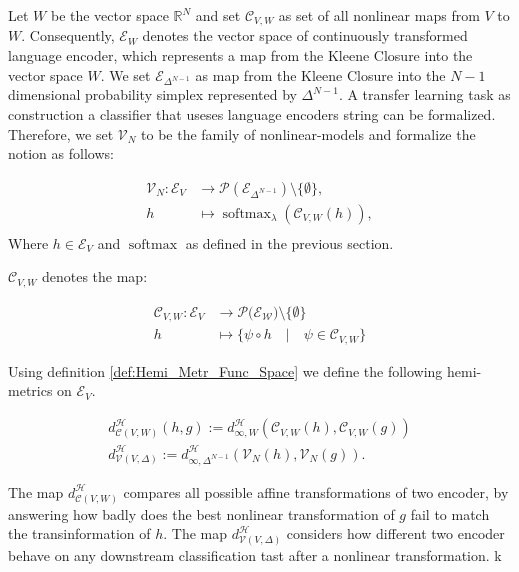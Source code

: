 Let $W$ be the vector space $\mathbb{R}^N$ and set $\mathcal{C}_{V,W}$ as set of all nonlinear maps from $V$ to $W$. 
Consequently, $\mathcal{E}_W$ denotes the vector space of continuously transformed language encoder, which represents a map from the Kleene Closure into the vector space $W$.
We set $\mathcal{E}_{\Delta^{N-1}}$ as map from the Kleene Closure into the $N-1$ dimensional probability simplex represented by $\Delta^{N-1}$.
A transfer learning task as construction a classifier that useses language encoders string can be formalized.
Therefore, we set $\mathcal{V}_N$ to be the family of nonlinear-models and formalize the notion as follows:

\begin{align*}
\mathcal{V}_N \colon \mathcal{E}_V &\to \mathcal{P}(\mathcal{E}_{\Delta^{N-1}}) \setminus \{\emptyset\}, \\
h &\mapsto \operatorname{softmax}_\lambda(\mathcal{C}_{V,W}(h)), \\
\end{align*}
Where $h \in \mathcal{E}_V$ and $\operatorname{softmax}$ as defined in the previous section.


$\mathcal{C}_{V,W}$ denotes the map:

\begin{align*}
\mathcal{C}_{V,W}:\mathcal{E}_V &\to \mathcal{P(E_\text{W}})\setminus\{\emptyset\}
\\
h &\mapsto \{\psi\circ h \quad | \quad \psi \in \mathcal{C}_{V,W}\}
\end{align*}

Using definition \ref{def:Hemi_Metr_Func_Space} we define the following hemi-metrics on $\mathcal{E}_V$.

\begin{align*}
d^\mathcal{H}_{\mathcal{C}(V,W)}(h,g):=d^\mathcal{H}_{\infty,W}(\mathcal{C}_{V,W}(h), \mathcal{C}_{V,W}(g))\\
d^\mathcal{H}_{\mathcal{V}(V,\Delta)}:= d^\mathcal{H}_{\infty,\Delta^{N-1}}(\mathcal{V}_N(h),\mathcal{V}_N(g)).
\end{align*}

The map $d^\mathcal{H}_{\mathcal{C}(V,W)}$ compares all possible affine transformations of two encoder, by answering how badly does the best nonlinear transformation of $g$ fail to match the transinformation of $h$.
The map $d^\mathcal{H}_{\mathcal{V}(V,\Delta)}$ considers how different two encoder behave on any downstream classification tast after a nonlinear transformation. k

